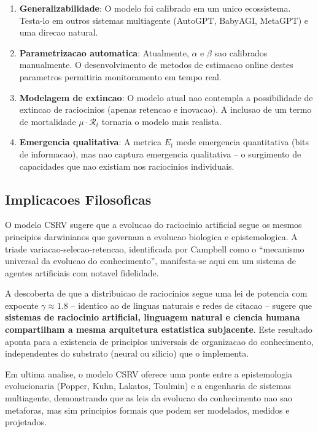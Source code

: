 \documentclass[5p]{elsarticle}
\begin{document}
\begin{enumerate}[label=(\roman*)]
  \item \textbf{Generalizabilidade}: O modelo foi calibrado em um unico
    ecossistema. Testa-lo em outros sistemas multiagente (AutoGPT,
    BabyAGI, MetaGPT) e uma direcao natural.

  \item \textbf{Parametrizacao automatica}: Atualmente, $\alpha$ e $\beta$
    sao calibrados manualmente. O desenvolvimento de metodos de estimacao
    online destes parametros permitiria monitoramento em tempo real.

  \item \textbf{Modelagem de extincao}: O modelo atual nao contempla a
    possibilidade de extincao de raciocinios (apenas retencao e inovacao).
    A inclusao de um termo de mortalidade $\mu \cdot \mathcal{R}_t$
    tornaria o modelo mais realista.

  \item \textbf{Emergencia qualitativa}: A metrica $E_t$ mede emergencia
    quantitativa (bits de informacao), mas nao captura emergencia qualitativa
    -- o surgimento de capacidades que nao existiam nos raciocinios
    individuais.
\end{enumerate}

\subsection{Implicacoes Filosoficas}

O modelo CSRV sugere que a evolucao do raciocinio artificial segue os mesmos
principios darwinianos que governam a evolucao biologica e epistemologica.
A triade variacao-selecao-retencao, identificada por Campbell \cite{campbell1960}
como o ``mecanismo universal da evolucao do conhecimento'', manifesta-se
aqui em um sistema de agentes artificiais com notavel fidelidade.

A descoberta de que a distribuicao de raciocinios segue uma lei de potencia
com expoente $\gamma \approx 1.8$ -- identico ao de linguas naturais e redes
de citacao -- sugere que \textbf{sistemas de raciocinio artificial, linguagem
natural e ciencia humana compartilham a mesma arquitetura estatistica
subjacente}. Este resultado aponta para a existencia de principios universais
de organizacao do conhecimento, independentes do substrato (neural ou
silicio) que o implementa.

Em ultima analise, o modelo CSRV oferece uma ponte entre a epistemologia
evolucionaria (Popper, Kuhn, Lakatos, Toulmin) e a engenharia de sistemas
multiagente, demonstrando que as leis da evolucao do conhecimento nao sao
metaforas, mas sim principios formais que podem ser modelados, medidos e
projetados.
\end{document}
